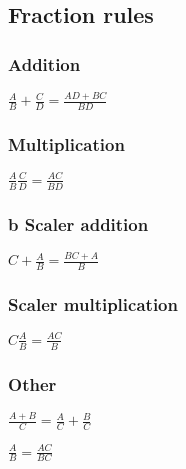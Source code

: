 \subsection{Fraction rules}

\subsubsection{Addition}

$\frac{A}{B}+\frac{C}{D}=\frac{AD+BC}{BD}$

\subsubsection{Multiplication}

$\frac{A}{B}\frac{C}{D}=\frac{AC}{BD}$

\subsubsection{b Scaler addition}

$C+\frac{A}{B}=\frac{BC+A}{B}$

\subsubsection{Scaler multiplication}

$C\frac{A}{B}=\frac{AC}{B}$

\subsubsection{Other}

$\frac{A+B}{C}=\frac{A}{C}+\frac{B}{C}$

$\frac{A}{B}=\frac{AC}{BC}$
